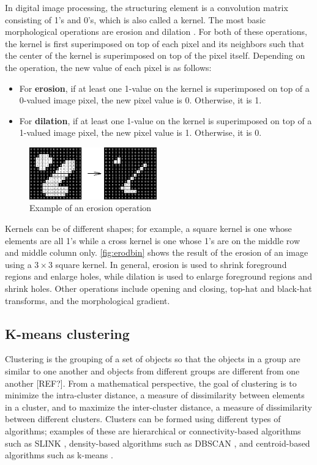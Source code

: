 \documentclass[conference,compsoc]{IEEEtran}
\begin{document}
\indent In digital image processing, the structuring element is a convolution matrix consisting of 1's and 0's, which is also called a kernel. The most basic morphological operations are erosion and dilation \cite{fisher03}. For both of these operations, the kernel is first superimposed on top of each pixel and its neighbors such that the center of the kernel is superimposed on top of the pixel itself. Depending on the operation, the new value of each pixel is as follows:
\begin{itemize}[\topsep=0pt]
  \item For \textbf{erosion}, if at least one 1-value on the kernel is superimposed on top of a 0-valued image pixel, the new pixel value is 0. Otherwise, it is 1.
  \item For \textbf{dilation}, if at least one 1-value on the kernel is superimposed on top of a 1-valued image pixel, the new pixel value is 1. Otherwise, it is 0.
\end{itemize} 
\begin{figure}[h]
	\includegraphics[width=0.49\textwidth]{erodbin.jpg}
	\caption{Example of an erosion operation}
	\label{fig:erodbin}
\end{figure}
Kernels can be of different shapes; for example, a square kernel is one whose elements are all 1's while a cross kernel is one whose 1's are on the middle row and middle column only. \hyperref[fig:erodbin]{\autoref{fig:erodbin}} shows the result of the erosion of an image using a $3 \times 3$ square kernel. In general, erosion is used to shrink foreground regions and enlarge holes, while dilation is used to enlarge foreground regions and shrink holes. Other operations include opening and closing, top-hat and black-hat transforms, and the morphological gradient.

\subsection{K-means clustering}
Clustering is the grouping of a set of objects so that the objects in a group are similar to one another and objects from different groups are different from one another [REF?]. From a mathematical perspective, the goal of clustering is to minimize the intra-cluster distance, a measure of dissimilarity between elements in a cluster, and to maximize the inter-cluster distance, a measure of dissimilarity between different clusters. Clusters can be formed using different types of algorithms; examples of these are hierarchical or connectivity-based algorithms such as SLINK \cite{sibson73}, density-based algorithms such as DBSCAN \cite{ester96}, and centroid-based algorithms such as k-means \cite{lloyd82}.\\
\end{document}
